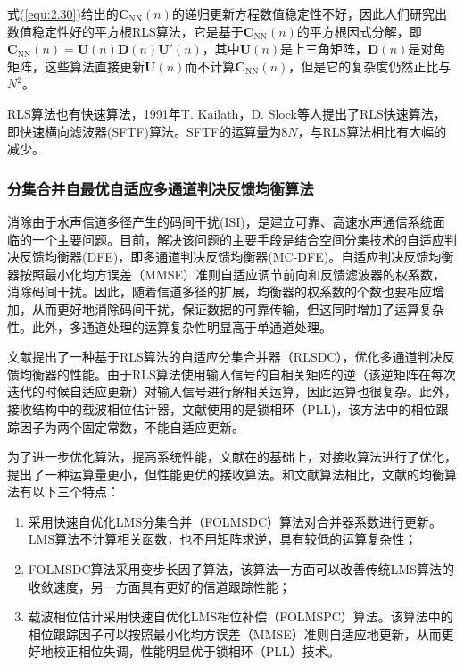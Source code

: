 式(\ref{equ:2.30})给出的$\mathbf{C}_{\mathrm{NN}}(n)$的递归更新方程数值稳定性不好，因此人们研究出数值稳定性好的平方根RLS算法，它是基于$\mathbf{C}_{\mathrm{NN}}(n)$的平方根因式分解，即$\mathbf{C}_{\mathrm{NN}}(n)=\mathbf{U}(n)\mathbf{D}(n){\mathbf{U}}'(n)$，其中$\mathbf{U}(n)$是上三角矩阵，$\mathbf{D}(n)$是对角矩阵，这些算法直接更新$\mathbf{U}(n)$而不计算$\mathbf{C}_{\mathrm{NN}}(n)$，但是它的复杂度仍然正比与$N^2$。

RLS算法也有快速算法，1991年T. Kailath，D.
Slock\citep{Cioffi1984,Slock1991,Slock1989,Slock1992,Benallal1989}等人提出了RLS快速算法，即快速横向滤波器(SFTF)算法。SFTF的运算量为$8N$，与RLS算法相比有大幅的减少。
\subsubsection*{分集合并自最优自适应多通道判决反馈均衡算法}
消除由于水声信道多径产生的码间干扰(ISI)，是建立可靠、高速水声通信系统面临的一个主要问题。目前，解决该问题的主要手段是结合空间分集技术的自适应判决反馈均衡器(DFE)，即多通道判决反馈均衡器(MC-DFE)\citep{Geller1996,Capellano1998,Geller1995,stojanovic1993,catipovic1996spatial,Ritcey1992,Gooch1988,Monsen1977,Balaban1992,Stojanvoic1993adaptive}。自适应判决反馈均衡器按照最小化均方误差（MMSE）准则自适应调节前向和反馈滤波器的权系数，消除码间干扰。因此，随着信道多径的扩展，均衡器的权系数的个数也要相应增加，从而更好地消除码间干扰，保证数据的可靠传输，但这同时增加了运算复杂性。此外，多通道处理的运算复杂性明显高于单通道处理。

文献提出了一种基于RLS算法的自适应分集合并器（RLSDC），优化多通道判决反馈均衡器的性能。由于RLS算法使用输入信号的自相关矩阵的逆（该逆矩阵在每次迭代的时候自适应更新）对输入信号进行解相关运算，因此运算也很复杂。此外，接收结构中的载波相位估计器，文献使用的是锁相环（PLL)，该方法中的相位跟踪因子为两个固定常数，不能自适应更新。

为了进一步优化算法，提高系统性能，文献在的基础上，对接收算法进行了优化，提出了一种运算量更小，但性能更优的接收算法。和文献算法相比，文献的均衡算法有以下三个特点：
\begin{enumerate}
    \item
       采用快速自优化LMS分集合并（FOLMSDC）算法对合并器系数进行更新。LMS算法不计算相关函数，也不用矩阵求逆，具有较低的运算复杂性；
   \item
       FOLMSDC算法采用变步长因子算法，该算法一方面可以改善传统LMS算法的收敛速度，另一方面具有更好的信道跟踪性能；
   \item  载波相位估计采用快速自优化LMS相位补偿（FOLMSPC）算法。该算法中的相位跟踪因子可以按照最小化均方误差（MMSE）准则自适应地更新，从而更好地校正相位失调，性能明显优于锁相环（PLL）技术。
\end{enumerate}

